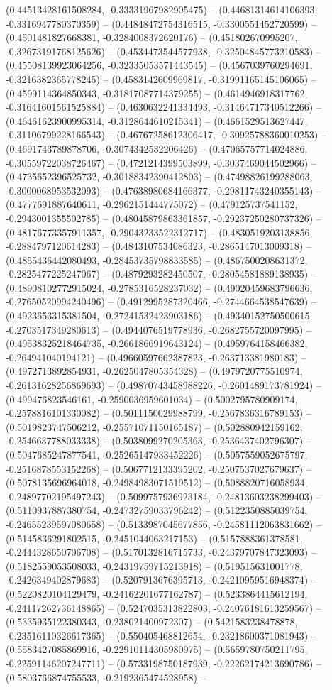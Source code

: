 (0.44513428161508284, -0.33331967982905475) -- (0.44681314614106393, -0.3316947780370359) -- (0.44848472754316515, -0.3300551452720599) -- (0.4501481827668381, -0.3284008372620176) -- (0.451802670995207, -0.32673191768125626) -- (0.4534473544577938, -0.32504845773210583) -- (0.45508139923064256, -0.32335053571443545) -- (0.4567039760294691, -0.3216382365778245) -- (0.4583142609969817, -0.31991165145106065) -- (0.4599114364850343, -0.31817087714379255) -- (0.4614946918317762, -0.31641601561525884) -- (0.4630632241334493, -0.31464717340512266) -- (0.46461623900995314, -0.3128644610215341) -- (0.4661529513627447, -0.31106799228166543) -- (0.46767258612306417, -0.30925788360010253) -- (0.4691743789878706, -0.3074342532206426) -- (0.47065757714024886, -0.30559722038726467) -- (0.4721214399503899, -0.3037469044502966) -- (0.4735652396525732, -0.30188342390412803) -- (0.47498826199288063, -0.3000068953532093) -- (0.47638980684166377, -0.29811743240355143) -- (0.4777691887640611, -0.2962151444775072) -- (0.479125737541152, -0.2943001355502785) -- (0.48045879863361857, -0.29237250280737326) -- (0.48176773357911357, -0.29043233522312717) -- (0.4830519203138856, -0.2884797120614283) -- (0.4843107534086323, -0.2865147013009318) -- (0.4855436442080493, -0.28453735798833585) -- (0.4867500208631372, -0.2825477225247067) -- (0.4879293282450507, -0.28054581889138935) -- (0.48908102772915024, -0.2785316528237032) -- (0.49020459683796636, -0.27650520994240496) -- (0.4912995287320466, -0.2744664538547639) -- (0.4923653315381504, -0.27241532423903186) -- (0.49340152750500615, -0.2703517349280613) -- (0.4944076519778936, -0.2682755720097995) -- (0.49538325218464735, -0.2661866919643124) -- (0.4959764158466382, -0.264941040194121) -- (0.49660597662387823, -0.263713381980183) -- (0.4972713892854931, -0.2625047805354328) -- (0.4979720775510974, -0.26131628256869693) -- (0.49870743458988226, -0.2601489173781924) -- (0.499476823546161, -0.2590036959601034) -- (0.5002795780909174, -0.2578816101330082) -- (0.5011150029988799, -0.2567836316789153) -- (0.5019823747506212, -0.25571071150165187) -- (0.502880942159162, -0.2546637788033338) -- (0.5038099270205363, -0.2536437402796307) -- (0.5047685247877541, -0.25265147933452226) -- (0.5057559052675797, -0.2516878553152268) -- (0.5067712133395202, -0.2507537027679637) -- (0.5078135696964018, -0.24984983071519512) -- (0.5088820716058934, -0.24897702195497243) -- (0.5099757936923184, -0.24813603238299403) -- (0.5110937887380754, -0.24732759033796242) -- (0.5122350885039754, -0.24655239597080658) -- (0.5133987045677856, -0.24581112063831662) -- (0.5145836291802515, -0.2451044063217153) -- (0.5157888361378581, -0.2444328650706708) -- (0.5170132816715733, -0.24379707847323093) -- (0.5182559053508033, -0.24319759715213918) -- (0.519515631001778, -0.2426349402879683) -- (0.5207913676395713, -0.24210959516948374) -- (0.5220820104129479, -0.24162201677162787) -- (0.5233864415612194, -0.24117262736148865) -- (0.5247035313822803, -0.24076181613259567) -- (0.5335935122380343, -0.238021400972307) -- (0.5421583238478878, -0.23516110326617365) -- (0.550405468812654, -0.23218600371081943) -- (0.5583427085869916, -0.22910114305980975) -- (0.5659780750211795, -0.22591146207247711) -- (0.5733198750187939, -0.22262174213690786) -- (0.5803766874755533, -0.2192365474528958) -- 